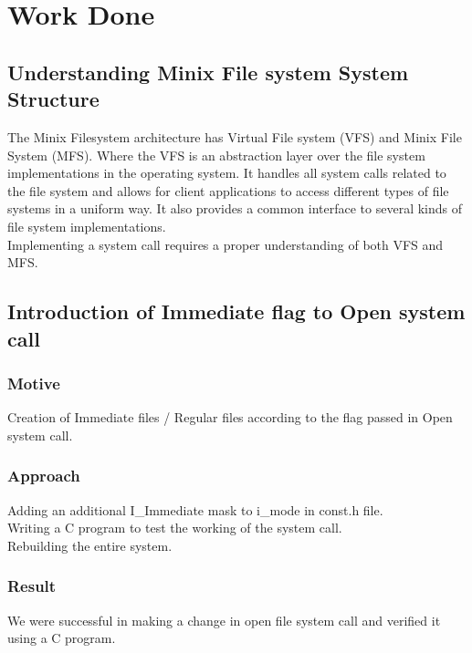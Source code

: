 \chapter{Work Done}

\section{Understanding Minix File system System Structure}

The Minix Filesystem architecture has Virtual File system (VFS) and Minix File System (MFS). Where the VFS is an abstraction layer over the file system implementations in the operating system. It handles all system calls related to the file system and allows for client applications to access different types of file systems in a uniform way. It also provides a common interface to several kinds of file system implementations. \\
Implementing a system call requires a proper understanding of both VFS and MFS.

\section{Introduction of Immediate flag to Open system call}
\subsection{Motive}
Creation of Immediate files / Regular files according to the flag passed in Open system call.
\subsection{Approach}
Adding an additional I\_Immediate mask to i\_mode in const.h file.\\	
Writing a C program to test the working of the system call.\\
Rebuilding the entire system.
\subsection{Result}
We were successful in making a change in open file system call and verified it using a C program.



